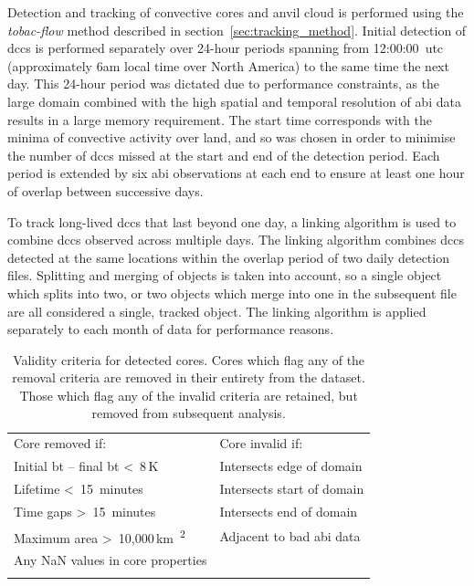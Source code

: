 Detection and tracking of convective cores and anvil cloud is performed using the \textit{tobac-flow} method \citep{jones_semi-lagrangian_2023} described in section~\ref{sec:tracking_method}.
Initial detection of \acrshort{dcc}s is performed separately over 24-hour periods spanning from 12:00:00~\acrshort{utc} (approximately 6am local time over North America) to the same time the next day.
This 24-hour period was dictated due to performance constraints, as the large domain combined with the high spatial and temporal resolution of \acrshort{abi} data results in a large memory requirement.
The start time corresponds with the minima of convective activity over land, and so was chosen in order to minimise the number of \acrshort{dcc}s missed at the start and end of the detection period.
Each period is extended by six \acrshort{abi} observations at each end to ensure at least one hour of overlap between successive days.

To track long-lived \acrshort{dcc}s that last beyond one day, a linking algorithm is used to combine \acrshort{dcc}s observed across multiple days.
The linking algorithm combines \acrshort{dcc}s detected at the same locations within the overlap period of two daily detection files.
Splitting and merging of objects is taken into account, so a single object which splits into two, or two objects which merge into one in the subsequent file are all considered a single, tracked object.
The linking algorithm is applied separately to each month of data for performance reasons.

\begin{table}[b]
\centering
\begin{tabular}{ll}
\tophline
Core removed if:                                                    & Core invalid if: \\
\middlehline
Initial \acrshort{bt} -- final \acrshort{bt} \textless~8\,\unit{K}  & Intersects edge of domain \\
Lifetime \textless~15~minutes                                       & Intersects start of domain \\
Time gaps \textgreater~15~minutes                                   & Intersects end of domain \\
Maximum area \textgreater~10,000\,\unit{km\textsuperscript{2}}      & Adjacent to bad \acrshort{abi} data \\
Any NaN values in core properties                                   & \\
\bottomhline
\end{tabular}
\caption[
Validity criteria for detected cores
]{
Validity criteria for detected cores. Cores which flag any of the removal criteria are removed in their entirety from the dataset. Those which flag any of the invalid criteria are retained, but removed from subsequent analysis.}
\label{table:core_validity_criteria}
\end{table}


